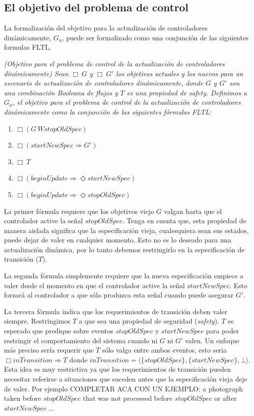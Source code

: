 \subsection{El objetivo del problema de control}

La formalización del objetivo para la actualización de controladores dinámicamente, $G_u$, puede ser formalizado
como una conjunción de las siguientes formulas FLTL.

\begin{nahaDef}
\label{update_goals_def}
\emph{(Objetivo para el problema de control de la actualización de controladores dinámicamente) Sean $\Box\ G$ y $\Box\ G'$
los objetivos actuales y los nuevos para un escenario de actualización de controladores dinámicamente, donde $G$ y $G'$
son una combinación Booleana de flujos y $T$ es una propiedad de safety. Definimos a $G_u$, el objetivo para el
problema de control de la actualización de controladores dinámicamente como la conjunción de las siguientes fórmulas
FLTL:}

\begin{enumerate}
\itemsep-4mm
\item $\Box(G\ W stopOldSpec)$
\item $\Box(startNewSpec \Longrightarrow G')$
\item $\Box\ T$
\item $\Box(beginUpdate \Longrightarrow \Diamond startNewSpec)$
\item $\Box(beginUpdate \Longrightarrow \Diamond stopOldSpec)$
\end{enumerate}
\end{nahaDef}

La primer fórmula requiere que los objetivos viejo $G$ valgan hasta que el controlador active la señal $stopOldSpec$.
Tenga en cuenta que, esta propiedad de manera aislada significa que la especificación vieja, cualesquiera sean sus estados,
puede dejar de valer en cualquier momento. Esto no es lo deseado para una actualización dinámica, por lo tanto debemos
restringirlo en la especificación de transición ($T$).

La segunda fórmula simplemente requiere que la nueva especificación empiece a valer desde el momento en que el
controlador active la señal $startNewSpec$. Esto forzará al controlador a que sólo produzca esta señal cuando puede
asegurar $G'$.

La tercera fórmula indica que los requerimientos de transición deben valer siempre. Restringimos $T$ a que sea una
propiedad de seguridad (\emph{safety}). $T$ es esperado que predique sobre eventos $stopOldSpec$ y $startNewSpec$ para
poder restringir el comportamiento del sistema cuando ni $G$ ni $G'$ valen. Un enfoque más preciso sería requerir que
$T$ sólo valga entre ambos eventos, esto seria $\Box inTransition \Longrightarrow T$ donde $inTransition =
\langle\{stopOldSpec\},\{startNewSpec\}, \bot\rangle$. Esta idea es muy restrictiva ya que los requerimientos de transición
pueden necesitar referirse a situaciones que suceden antes que la especificación vieja deje de valer. Por ejemplo
COMPLETAR ACA CON UN EJEMPLO: a photograph taken before $stopOldSpec$ that was not processed before $stopOldSpec$ or
after $startNewSpec$ ...

